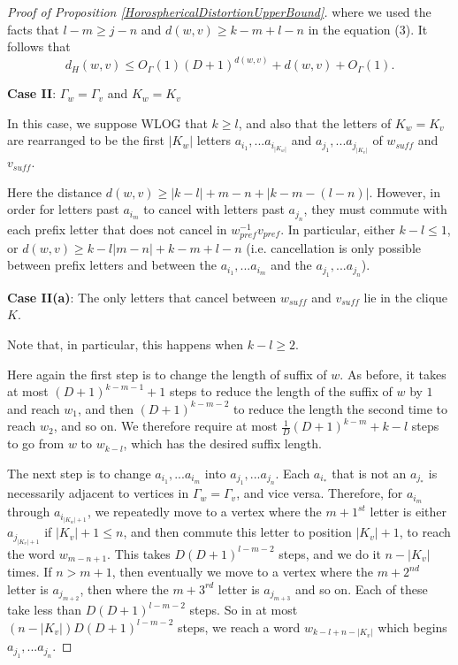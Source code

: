 \documentclass[10pt,a4paper]{amsart}
\theoremstyle{definition}
\theoremstyle{remark}
\begin{document}
\begin{proof} [Proof of Proposition \ref{HorosphericalDistortionUpperBound}]
		where we used the facts that $l-m\ge j-n$ and $d(w,v)\ge k-m+l-n$ in the equation (3). It follows that $$d_H(w,v)\le O_\Gamma(1)(D+1)^{d(w,v)}+d(w,v)+O_\Gamma(1).$$
		
		\textbf{Case II}: $\Gamma_w=\Gamma_v$ and $K_w=K_v$
		
		In this case, we suppose WLOG that $k\ge l$, and also that the letters of $K_w=K_v$ are rearranged to be the first $|K_w|$ letters $a_{i_1}, ... a_{i_{|K_w|}}$ and $a_{j_1}, ... a_{j_{|K_v|}}$ of $w_{suff}$ and $v_{suff}$.
		
		Here the distance $d(w,v) \ge |k-l|+m-n+|k-m-(l-n)|$. However, in order for letters past $a_{i_m}$ to cancel with letters past $a_{j_n}$, they must commute with each prefix letter that does not cancel in $w_{pref}^{-1}v_{pref}$. In particular, either $k-l\le 1$, or $d(w,v) \ge k-l |m-n|+k-m+l-n$ (i.e. cancellation is only possible between prefix letters and between the $a_{i_1}, ... a_{i_m}$ and the $a_{j_1}, ... a_{j_n}$).
		
		\textbf{Case II(a)}: The only letters that cancel between $w_{suff}$ and $v_{suff}$ lie in the clique $K$.
		
		Note that, in particular, this happens when $k-l\ge 2$.
		
		Here again the first step is to change the length of suffix of $w$. As before, it takes at most \newline $(D+1)^{k-m-1}+1$ steps to reduce the length of the suffix of $w$ by $1$ and reach $w_1$, and then $(D+1)^{k-m-2}$ to reduce the length the second time to reach $w_2$, and so on. We therefore require at most $\frac{1}{D}(D+1)^{k-m}+k-l$ steps to go from $w$ to $w_{k-l}$, which has the desired suffix length.
		
		The next step is to change $a_{i_1}, ... a_{i_m}$ into $a_{j_1}, ... a_{j_n}$. Each $a_{i_*}$ that is not an $a_{j_*}$ is necessarily adjacent to vertices in $\Gamma_w=\Gamma_v$, and vice versa. Therefore, for $a_{i_m}$ through $a_{i_{|K_w|+1}}$, we repeatedly move to a vertex where the $m+1^{st}$ letter is either $a_{j_{|K_v|+1}}$ if $|K_v|+1\le n$, and then commute this letter to position $|K_v|+1$, to reach the word $w_{m-n+1}$. This takes $D(D+1)^{l-m-2}$ steps, and we do it $n-|K_v|$ times. If $n>m+1$, then eventually we move to a vertex where the $m+2^{nd}$ letter is $a_{j_{m+2}}$, then where the $m+3^{rd}$ letter is $a_{j_{m+3}}$ and so on. Each of these take less than $D(D+1)^{l-m-2}$ steps. So in at most $(n-|K_v|)D(D+1)^{l-m-2}$ steps, we reach a word $w_{k-l+n-|K_v|}$ which begins $a_{j_1}, ... a_{j_n}$.
		

\end{proof}
\end{document}
